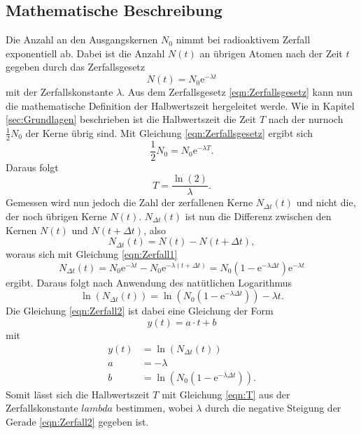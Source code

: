 \subsection{Mathematische Beschreibung}
\label{sec:mathe}
Die Anzahl an den Ausgangskernen $N_0$ nimmt bei radioaktivem Zerfall exponentiell ab. Dabei ist die 
Anzahl $N(t)$ an übrigen Atomen nach der Zeit $t$ gegeben durch das Zerfallsgesetz
\begin{equation}
    N(t)=N_0\text{e}^{-\lambda t} 
    \label{eqn:Zerfallsgesetz}
\end{equation}
mit der Zerfallskonstante $\lambda$. Aus dem Zerfallsgesetz \ref{eqn:Zerfallsgesetz} kann nun die mathematische
Definition der Halbwertszeit hergeleitet werde. Wie in Kapitel \ref{sec:Grundlagen} beschrieben ist die 
Halbwertszeit die Zeit $T$ nach der nurnoch $\frac{1}{2}N_0$ der Kerne übrig sind. Mit Gleichung 
\ref{eqn:Zerfallsgesetz} ergibt sich
\begin{equation*}
    \frac{1}{2}N_0=N_0\text{e}^{-\lambda T}.
\end{equation*}
Daraus folgt 
\begin{equation}
    T=\frac{\ln(2)}{\lambda} 
    \label{eqn:T}.
\end{equation}
Gemessen wird nun jedoch die Zahl der zerfallenen Kerne $N_{\Delta t}(t)$ und nicht die, der noch übrigen
Kerne $N(t)$. $N_{\Delta t}(t)$ ist nun die Differenz zwischen den Kernen $N(t)$ und $N(t+\Delta t)$, 
also
\begin{equation*}
    N_{\Delta t}(t)=N(t)-N(t+\Delta t) 
    \label{eqn:Zerfall1},
\end{equation*}
woraus sich mit Gleichung \ref{eqn:Zerfall1}
\begin{equation*}
    N_{\Delta t}(t)=N_0\text{e}^{-\lambda t}-N_0\text{e}^{-\lambda (t+\Delta t)}
    =N_0(1-\text{e}^{-\lambda \Delta t})\text{e}^{-\lambda t}
\end{equation*}
ergibt. Daraus folgt nach Anwendung des natütlichen Logarithmus 
\begin{equation}
    \ln(N_{\Delta t}(t))
    =\ln(N_0(1-\text{e}^{-\lambda \Delta t}))-\lambda t 
    \label{eqn:Zerfall2}.
\end{equation}
Die Gleichung \ref{eqn:Zerfall2} ist dabei eine Gleichung der Form 
\begin{equation}
    y(t)=a\cdot t+b 
    \label{eqn:gerade}
\end{equation}
mit
\begin{align*}
    y(t)&=\ln(N_{\Delta t}(t))\\
    a&=-\lambda\\
    b&=\ln(N_0(1-\text{e}^{-\lambda \Delta t})).
\end{align*}
Somit lässt sich die Halbwertszeit $T$ mit Gleichung \ref{eqn:T} aus der Zerfallskonstante $lambda$
bestimmen, wobei $\lambda$ durch die negative Steigung der Gerade \ref{eqn:Zerfall2} gegeben ist.
